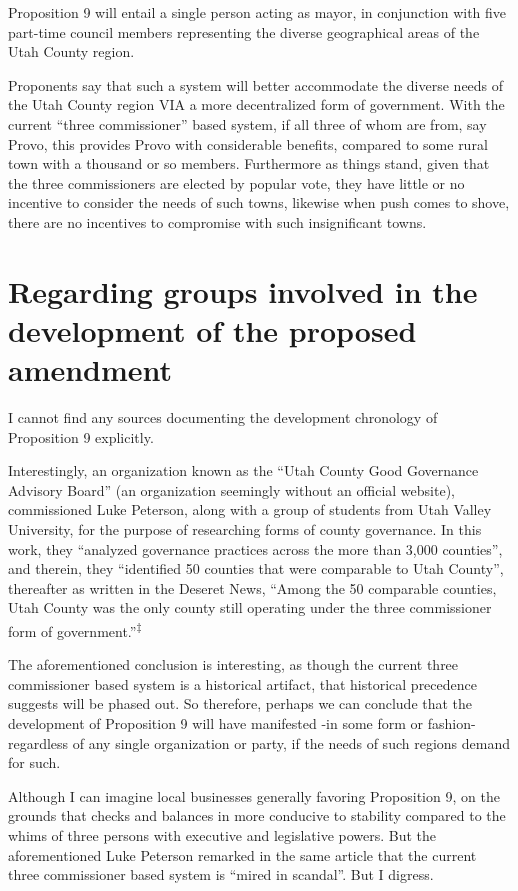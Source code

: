Proposition 9 will entail a single person acting as mayor, in conjunction with five part-time council members representing the diverse geographical areas of the Utah County region. 

Proponents say that such a system will better accommodate the diverse needs of the Utah County region VIA a more decentralized form of government. With the current “three commissioner” based system, if all three of whom are from, say Provo, this provides Provo with considerable benefits, compared to some rural town with a thousand or so members. Furthermore as things stand, given that the three commissioners are elected by popular vote, they have little or no incentive to consider the needs of such towns, likewise when push comes to shove, there are no incentives to compromise with such insignificant towns. 


\section{Regarding groups involved in the development of the proposed amendment}

I cannot find any sources documenting the development chronology of Proposition 9 explicitly.


Interestingly, an organization known as the ``Utah County Good Governance Advisory Board'' (an organization seemingly without an official website), commissioned Luke Peterson, along with a group of students from Utah Valley University, for the purpose of researching forms of county governance. In this work, they ``analyzed governance practices across the more than 3,000 counties'', and therein, they ``identified 50 counties that were comparable to Utah County'', thereafter as written in the Deseret News, ``Among the 50 comparable counties, Utah County was the only county still operating under the three commissioner form of government.''\textsuperscript{‡}

The aforementioned conclusion is interesting, as though the current three commissioner based system is a historical artifact, that historical precedence suggests will be phased out. So therefore, perhaps we can conclude that the development of Proposition 9 will have manifested -in some form or fashion- regardless of any single organization or party, if the needs of such regions demand for such.

Although I can imagine local businesses generally favoring Proposition 9, on the grounds that checks and balances in more conducive to stability compared to the whims of three persons with executive and legislative powers. But the aforementioned Luke Peterson remarked in the same article that the current three commissioner based system is ``mired in scandal''. But I digress.


